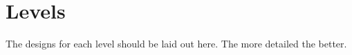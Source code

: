 \section{Levels} %
The designs for each level should be laid out here. The more detailed the
better.